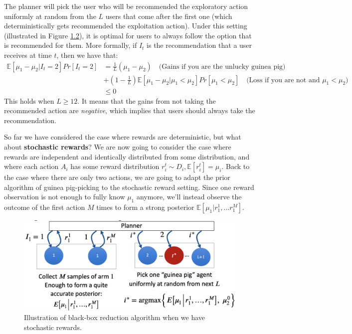 \documentclass[
  letterpaper,
  DIV=11,
  numbers=noendperiod,
  oneside]{scrreprt}
\theoremstyle{remark}
\begin{document}
The planner will pick the user who will be recommended the exploratory
action uniformly at random from the \(L\) users that come after the
first one (which deterministically gets recommended the exploitation
action). Under this setting (illustrated in Figure
\hyperref[fig:deterministic-guinea-pig]{1.2}), it is optimal for users
to always follow the option that is recommended for them. More formally,
if \(I_t\) is the recommendation that a user receives at time \(t\),
then we have that: \[\begin{split}
    \mathbb{E}[\mu_1 - \mu_2 | I_t = 2] Pr[I_t = 2] &= \frac{1}{L} (\mu_1 - \mu_2) \quad \text{(Gains if you are the unlucky guinea pig)}\\
    &+ (1 - \frac{1}{L}) \mathbb{E}[\mu_1 - \mu_2 | \mu_1 < \mu_2] Pr[\mu_1 < \mu_2] \quad \text{(Loss if you are not and $\mu_1 < \mu_2$)}\\
    &\leq 0
\end{split}\] This holds when \(L \geq 12\). It means that the gains
from not taking the recommended action are \emph{negative}, which
implies that users should always take the recommendation.

So far we have considered the case where rewards are deterministic, but
what about \textbf{stochastic rewards}? We are now going to consider the
case where rewards are independent and identically distributed from some
distribution, and where each action \(A_i\) has some reward distribution
\(r_i^t \sim D_i, \mathbb{E}[r_i^t] = \mu_i\). Back to the case where
there are only two actions, we are going to adapt the prior algorithm of
guinea pig-picking to the stochastic reward setting. Since one reward
observation is not enough to fully know \(\mu_1\) anymore, we'll instead
observe the outcome of the first action \(M\) times to form a strong
posterior \(\mathbb{E}[\mu_1 | r_1^1, \ldots r_1^M]\).

\begin{figure}

{\centering \includegraphics{Figures/stochastic_guinea_pig.png}

}

\caption{Illustration of black-box reduction algorithm when we have
stochastic rewards.}

\end{figure}%
\end{document}

